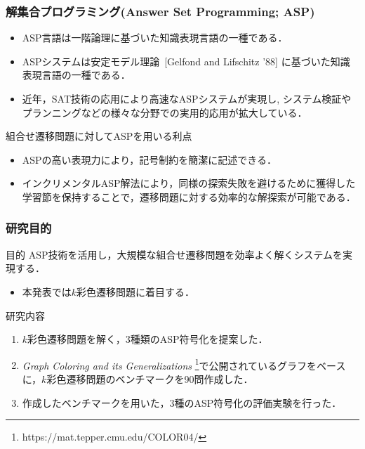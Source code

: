 \documentclass[dvipdfmx,11pt]{beamer}
\begin{document}
\begin{frame}\frametitle{解集合プログラミング(Answer Set Programming; ASP)}

  \begin{itemize}
    \item ASP言語は一階論理に基づいた知識表現言語の一種である．
    \item ASPシステムは安定モデル理論~[Gelfond and Lifschitz '88] に基づいた知識表現言語の一種である．
    \item 近年，SAT技術の応用により高速なASPシステムが実現し, システム検証やプランニングなどの様々な分野での実用的応用が拡大している．
  \end{itemize}

  \begin{alertblock}{組合せ遷移問題に対してASPを用いる利点}
    \begin{itemize}
      \item ASPの高い表現力により，記号制約を簡潔に記述できる．
      \item インクリメンタルASP解法により，同様の探索失敗を避けるために獲得した学習節を保持することで，遷移問題に対する効率的な解探索が可能である．
    \end{itemize}
  \end{alertblock}
  
\end{frame}


\begin{frame}\frametitle{研究目的}
  \begin{alertblock}{目的}
    ASP技術を活用し，大規模な組合せ遷移問題を効率よく解くシステムを実現する．%
    \begin{itemize}
      \item 本発表では$k$彩色遷移問題に着目する．
    \end{itemize}
  \end{alertblock}

  \begin{block}{研究内容}
    \begin{enumerate}
      \item $k$彩色遷移問題を解く，3種類のASP符号化を提案した．
      \item \textit{Graph Coloring and its Generalizations}
      \footnote{https://mat.tepper.cmu.edu/COLOR04/}で公開されているグラフをベースに，$k$彩色遷移問題のベンチマークを90問作成した．
      \item 作成したベンチマークを用いた，3種のASP符号化の評価実験を行った．
    \end{enumerate}
  \end{block}

\end{frame}
\end{document}
